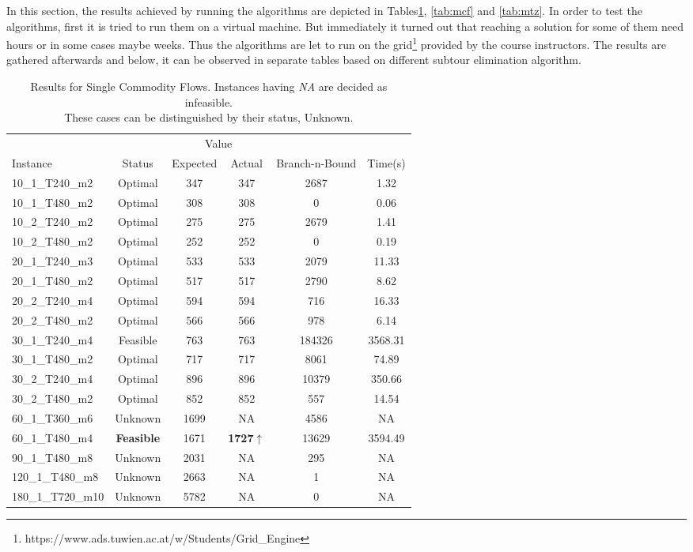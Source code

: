 In this section, the results achieved by running the algorithms are depicted in
Tables\ref{tab:scf}, \ref{tab:mcf} and \ref{tab:mtz}.
In order to test the algorithms, first it is tried to run them on a virtual
machine. But immediately it turned out that reaching a solution for some of them
need hours or in some cases maybe weeks. Thus the algorithms are let to run
on the grid\footnote{https://www.ads.tuwien.ac.at/w/Students/Grid\_Engine}
provided by the course instructors. The results are gathered afterwards and
below, it can be observed in separate tables based on different subtour
elimination algorithm.

\begin{center}

\begin{center}

\begin{table}[H]
    \begin{tabular}{ l c c c c c }
    \hline
    &&\multicolumn{2}{c}{Value} && \\
    \cmidrule(r){3-4}
    Instance & Status & Expected & Actual & Branch-n-Bound & Time(s) \\ \hline
    10\_1\_T240\_m2 & Optimal & 347& 347  & 2687 & 1.32 \\ 
	10\_1\_T480\_m2 & Optimal & 308& 308  & 0 & 0.06 \\ 
	10\_2\_T240\_m2 & Optimal & 275& 275  & 2679 & 1.41 \\ 
	10\_2\_T480\_m2 & Optimal & 252& 252  & 0 & 0.19 \\ 
	20\_1\_T240\_m3 & Optimal & 533& 533  & 2079 & 11.33 \\ 
	20\_1\_T480\_m2 & Optimal & 517& 517  & 2790 & 8.62 \\ 
	20\_2\_T240\_m4 & Optimal & 594& 594  & 716 & 16.33 \\ 
	20\_2\_T480\_m2 & Optimal & 566& 566  & 978 & 6.14 \\ 
	30\_1\_T240\_m4 & Feasible & 763& 763  & 184326 & 3568.31 \\ 
	30\_1\_T480\_m2 & Optimal & 717& 717  & 8061 & 74.89 \\ 
	30\_2\_T240\_m4 & Optimal & 896& 896  & 10379 & 350.66 \\ 
	30\_2\_T480\_m2 & Optimal & 852& 852  & 557 & 14.54 \\ 
	60\_1\_T360\_m6 & Unknown & 1699& NA &  4586 & NA \\ 
	60\_1\_T480\_m4 & {\bf Feasible} & 1671& {\bf 1727}$\uparrow$  & 13629 &
	3594.49
	\\
	90\_1\_T480\_m8 & Unknown & 2031& NA &  295 & NA \\ 
	120\_1\_T480\_m8 & Unknown & 2663& NA & 1 & NA \\ 
	180\_1\_T720\_m10 & Unknown & 5782& NA & 0 & NA \\
    \hline
    \end{tabular}
    \caption{\label{tab:scf} Results for Single Commodity Flows. Instances
    having {\it NA} are decided as infeasible. \\ These cases can be
    distinguished by their status, Unknown.
    }
\end{table}


\end{center}
\end{center}
